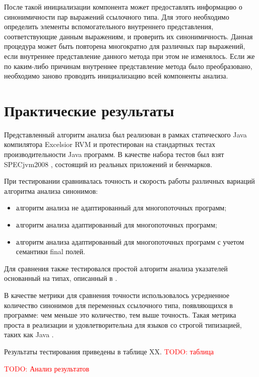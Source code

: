 \documentclass[14pt,titlepage]{extarticle}
\newcommand{\todo}[1]{\textcolor{red}{\eng{TODO}: #1}}
\newcommand{\eng}[1]{{\English#1}}
\let\oldsection\section
\renewcommand{\section}{\newpage\oldsection}
\begin{document}
      После такой инициализации компонента может предоставлять информацию о
      синонимичности пар выражений ссылочного типа. Для этого необходимо
      определить элементы вспомогательного внутреннего представления,
      соответствующие данным выражениям, и проверить их синонимичность.
      Данная процедура может быть повторена многократно для
      различных пар выражений, если внутреннее представление данного метода при
      этом не изменялось. Если же по каким-либо причинам внутреннее
      представление метода было преобразовано, необходимо заново проводить
      инициализацию всей компоненты анализа.

  \section{Практические результаты}

    Представленный алгоритм анализа был реализован в рамках статического
    Java компилятора Excelsior RVM и протестирован на стандартных тестах
    производительности Java программ.
    В качестве набора тестов был взят SPECjvm2008 \cite{spec_jvm}, состоящий из
    реальных приложений и бенчмарков.

    При тестировании сравнивалась точность и скорость работы различных вариаций
    алгоритма анализа синонимов:
    \begin{itemize}
      \item алгоритм анализа не адаптированный для многопоточных программ;
      \item алгоритм анализа адаптированный для многопоточных программ;
      \item алгоритм анализа адаптированный для многопоточных программ с
            учетом семантики final полей.
    \end{itemize}
    Для сравнения также тестировался простой алгоритм анализа указателей
    основанный на типах, описанный в \cite{diwan_tbaa}.

    В качестве метрики для сравнения точности использовалось усредненное
    количество синонимов для переменных ссылочного типа, появляющихся в
    программе: чем меньше это количество, тем выше точность. Такая метрика
    проста в реализации и удовлетворительна для языков со строгой типизацией,
    таких как Java \cite{hind_pointer_analysis_not_solved_yet}.

    Результаты тестирования приведены в таблице XX.
    \todo{таблица}

    \todo{Анализ результатов}
\end{document}
